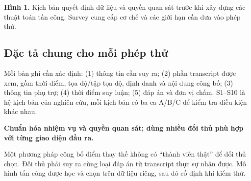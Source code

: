 \documentclass[10pt,a4paper]{article}
\newcommand{\key}[1]{\par\smallskip\noindent\colorbox{pale}{\parbox{\dimexpr\linewidth-2\fboxsep}{\textbf{#1}}}\par\smallskip}
\begin{document}
\begin{center}
\end{center}
\textbf{Hình 1.} Kịch bản quyết định dữ liệu và quyền quan sát trước khi xây dựng các thuật toán tấn công. Survey cung cấp cơ chế và các giới hạn cần đưa vào phép thử.

\subsection{Đặc tả chung cho mỗi phép thử}
Mỗi bản ghi cần xác định: (1) thông tin cần suy ra; (2) phần transcript được xem, gồm thời điểm, tọa độ/tập tọa độ, định danh và nội dung công bố; (3) thông tin phụ trợ; (4) thời điểm suy luận; (5) đáp án và đơn vị chấm. S1--S10 là hệ kịch bản của nghiên cứu, mỗi kịch bản có ba ca A/B/C để kiểm tra điều kiện khác nhau.

\key{Chuẩn hóa nhiệm vụ và quyền quan sát; dùng nhiều đối thủ phù hợp với từng giao diện đầu ra.}
Một phương pháp công bố điểm thay thế không có ``thành viên thật'' để đối thủ chọn. Đối thủ phải suy ra cùng loại đáp án từ transcript thực sự nhận được. Mô hình tấn công được học và chọn trên dữ liệu riêng, sau đó cố định khi kiểm thử.

\newpage
\end{document}
